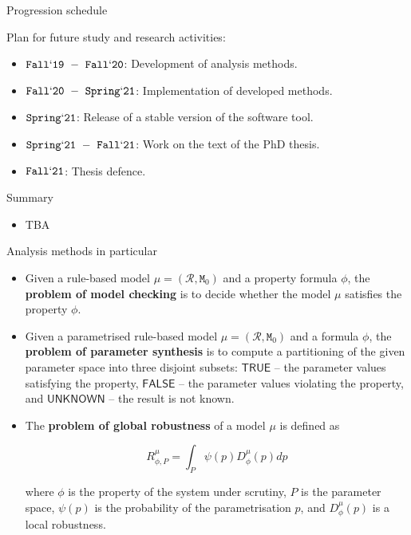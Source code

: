 \documentclass[10pt]{beamer}
\newcommand{\backupbegin}{
   \newcounter{framenumberappendix}
   \setcounter{framenumberappendix}{\value{framenumber}}
}
\newcommand{\backupend}{
   \addtocounter{framenumberappendix}{-\value{framenumber}}
   \addtocounter{framenumber}{\value{framenumberappendix}} 
}
\begin{document}
\begin{frame}[fragile]{Progression schedule}

Plan for future study and research activities:

\begin{itemize}
\item $\mathtt{Fall`19 ~-~ Fall`20}$: Development of analysis methods.
\item $\mathtt{Fall`20 ~-~ Spring`21}$: Implementation of developed methods.
\item $\mathtt{Spring`21}$: Release of a stable version of the software tool.
\item $\mathtt{Spring`21 ~-~ Fall`21}$: Work on the text of the PhD thesis.
\item $\mathtt{Fall`21}$: Thesis defence.
\end{itemize}

\end{frame}


\begin{frame}[fragile]{Summary}

\begin{itemize}
\item TBA
\end{itemize}

\end{frame}

\appendix


\backupbegin
\begin{frame}[fragile]{Analysis methods in particular}

{\small

\begin{itemize}
\item Given a rule-based model $\mu = (\mathcal{R}, \mathtt{M}_0)$ and a property formula $\phi$, the \textbf{problem of model checking} is to decide whether the model $\mu$ satisfies the property $\phi$.

\item Given a parametrised rule-based model $\mu = (\mathcal{R}, \mathtt{M}_0)$ and a formula $\phi$, the \textbf{problem of parameter synthesis} is to compute a partitioning of the given parameter space into three disjoint subsets: $\mathsf{TRUE}$ -- the parameter values satisfying the property, $\mathsf{FALSE}$ -- the parameter values violating the property, and $\mathsf{UNKNOWN}$ -- the result is not known.

\item The \textbf{problem of global robustness} of a model $\mu$ is defined as 

$$ R^{\mu}_{\phi, P} = \int_{P} \psi(p) D^{\mu}_{\phi}(p) dp $$

where $\phi$ is the property of the system under scrutiny, $P$ is the parameter space, $\psi(p)$ is the probability of the parametrisation $p$, and $D^{\mu}_{\phi}(p)$ is a local robustness.
\end{itemize}
}

\end{frame}
\backupend

\end{document}
